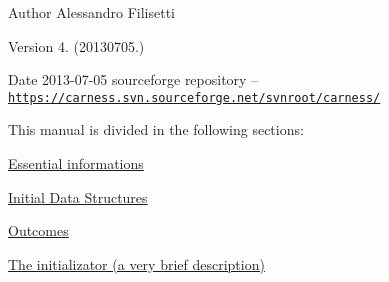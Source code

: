 \begin{DoxyAuthor}{Author}
Alessandro Filisetti 
\end{DoxyAuthor}
\begin{DoxyVersion}{Version}
4. (20130705.) 
\end{DoxyVersion}
\begin{DoxyDate}{Date}
2013-\/07-\/05 sourceforge repository -- \href{https://carness.svn.sourceforge.net/svnroot/carness/}{\tt https\-://carness.\-svn.\-sourceforge.\-net/svnroot/carness/}
\end{DoxyDate}
This manual is divided in the following sections\-:
\begin{DoxyItemize}
\item \hyperlink{intro}{Essential informations}
\item \hyperlink{pageInitStr}{Initial Data Structures}
\item \hyperlink{pageoutcomes}{Outcomes}
\item \hyperlink{pageInitializator}{The initializator (a very brief description)} 
\end{DoxyItemize}